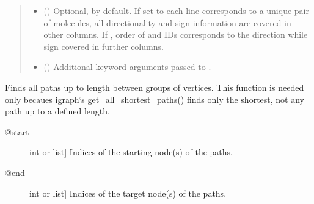 \documentclass[letterpaper,10pt,english]{sphinxmanual}
\begin{document}
\begin{fulllineitems}
\begin{fulllineitems}
\begin{quote}
\begin{description}
\begin{itemize}
\item {} 
 () \textendash{} Optional,  by default. If set to  each line
corresponds to a unique pair of molecules, all
directionality and sign information are covered in other
columns. If , order of  and  IDs
corresponds to the direction while sign covered in further
columns.

\item {} 
 (\sphinxstyleliteralemphasis{\sphinxupquote{**}}) \textendash{} Additional keyword arguments passed to
.

\end{itemize}

\end{description}\end{quote}

\end{fulllineitems}


\begin{fulllineitems}
\label{\detokenize{main:pypath.main.PyPath.filters}}
\end{fulllineitems}


\begin{fulllineitems}
\label{\detokenize{main:pypath.main.PyPath.find_all_paths}}
Finds all paths up to length  between groups of
vertices. This function is needed only becaues igraph{}`s
get\_all\_shortest\_paths() finds only the shortest, not any
path up to a defined length.
\begin{description}
\item[{@start}] \leavevmode{[}int or list{]}
Indices of the starting node(s) of the paths.

\item[{@end}] \leavevmode{[}int or list{]}
Indices of the target node(s) of the paths.


\end{description}
\end{fulllineitems}
\end{fulllineitems}
\end{document}
